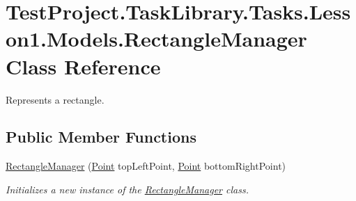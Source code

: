 \hypertarget{class_test_project_1_1_task_library_1_1_tasks_1_1_lesson1_1_1_models_1_1_rectangle_manager}{}\section{Test\+Project.\+Task\+Library.\+Tasks.\+Lesson1.\+Models.\+Rectangle\+Manager Class Reference}
\label{class_test_project_1_1_task_library_1_1_tasks_1_1_lesson1_1_1_models_1_1_rectangle_manager}


Represents a rectangle.  


\subsection*{Public Member Functions}
\begin{DoxyCompactItemize}
\item 
\mbox{\hyperlink{class_test_project_1_1_task_library_1_1_tasks_1_1_lesson1_1_1_models_1_1_rectangle_manager_ad733f405be87493a28168cd137eec1f3}{Rectangle\+Manager}} (\mbox{\hyperlink{class_test_project_1_1_task_library_1_1_tasks_1_1_lesson1_1_1_models_1_1_point}{Point}} top\+Left\+Point, \mbox{\hyperlink{class_test_project_1_1_task_library_1_1_tasks_1_1_lesson1_1_1_models_1_1_point}{Point}} bottom\+Right\+Point)
\begin{DoxyCompactList}\small\item\em Initializes a new instance of the \mbox{\hyperlink{class_test_project_1_1_task_library_1_1_tasks_1_1_lesson1_1_1_models_1_1_rectangle_manager}{Rectangle\+Manager}} class. \end{DoxyCompactList}\end{DoxyCompactItemize}

